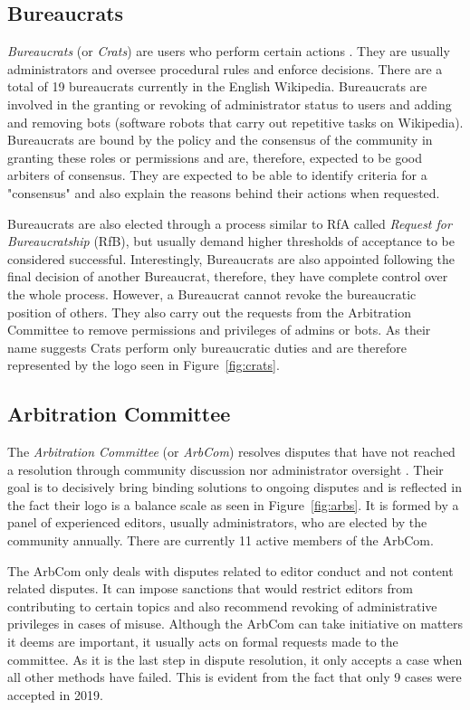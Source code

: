 \subsection{Bureaucrats}
\textit{Bureaucrats} (or \textit{Crats}) are users who perform certain actions \cite{wiki:bureaucrats}. They are usually administrators and oversee procedural rules and enforce decisions. There are a total of 19 bureaucrats currently in the English Wikipedia. Bureaucrats are involved in the granting or revoking of administrator status to users and adding and removing bots (software robots that carry out repetitive tasks on Wikipedia). Bureaucrats are bound by the policy and the consensus of the community in granting these roles or permissions and are, therefore, expected to be good arbiters of consensus. They are expected to be able to identify criteria for a "consensus" and also explain the reasons behind their actions when requested. 

Bureaucrats are also elected through a process similar to RfA called \textit{Request for Bureaucratship} (RfB), but usually demand higher thresholds of acceptance to be considered successful. Interestingly, Bureaucrats are also appointed following the final decision of another Bureaucrat, therefore, they have complete control over the whole process. However, a Bureaucrat cannot revoke the bureaucratic position of others. They also carry out the requests from the Arbitration Committee to remove permissions and privileges of admins or bots. As their name suggests Crats perform only bureaucratic duties and are therefore represented by the logo seen in Figure~\ref{fig:crats}.

\subsection{Arbitration Committee}
The \textit{Arbitration Committee} (or \textit{ArbCom}) resolves disputes that have not reached a resolution through community discussion nor administrator oversight \cite{wiki:arbcom}. Their goal is to decisively bring binding solutions to ongoing disputes and is reflected in the fact their logo is a balance scale as seen in Figure~\ref{fig:arbs}. It is formed by a panel of experienced editors, usually administrators, who are elected by the community annually. There are currently 11 active members of the ArbCom.

The ArbCom only deals with disputes related to editor conduct and not content related disputes. It can impose sanctions that would restrict editors from contributing to certain topics and also recommend revoking of administrative privileges in cases of misuse. Although the ArbCom can take initiative on matters it deems are important, it usually acts on formal requests made to the committee. As it is the last step in dispute resolution, it only accepts a case when all other methods have failed. This is evident from the fact that only 9 cases were accepted in 2019. 


